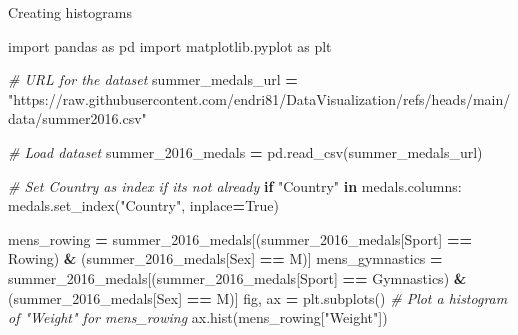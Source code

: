 \documentclass[
  ignorenonframetext,
]{beamer}
\newenvironment{Shaded}{\begin{snugshade}}{\end{snugshade}}
\newcommand{\CommentTok}[1]{\textcolor[rgb]{0.56,0.35,0.01}{\textit{#1}}}
\newcommand{\ControlFlowTok}[1]{\textcolor[rgb]{0.13,0.29,0.53}{\textbf{#1}}}
\newcommand{\ImportTok}[1]{#1}
\newcommand{\KeywordTok}[1]{\textcolor[rgb]{0.13,0.29,0.53}{\textbf{#1}}}
\newcommand{\NormalTok}[1]{#1}
\newcommand{\OperatorTok}[1]{\textcolor[rgb]{0.81,0.36,0.00}{\textbf{#1}}}
\newcommand{\StringTok}[1]{\textcolor[rgb]{0.31,0.60,0.02}{#1}}
\newcommand{\VariableTok}[1]{\textcolor[rgb]{0.00,0.00,0.00}{#1}}
\begin{document}
\begin{frame}[fragile]{Creating histograms}
\label{creating-histograms-2}

\begin{Shaded}
\begin{Highlighting}[]
\ImportTok{import}\NormalTok{ pandas }\ImportTok{as}\NormalTok{ pd}
\ImportTok{import}\NormalTok{ matplotlib.pyplot }\ImportTok{as}\NormalTok{ plt}

\CommentTok{\# URL for the dataset}
\NormalTok{summer\_medals\_url }\OperatorTok{=} \StringTok{"https://raw.githubusercontent.com/endri81/DataVisualization/refs/heads/main/data/summer2016.csv"}

\CommentTok{\# Load dataset}
\NormalTok{summer\_2016\_medals }\OperatorTok{=}\NormalTok{ pd.read\_csv(summer\_medals\_url)}

\CommentTok{\# Set \textquotesingle{}Country\textquotesingle{} as index if it\textquotesingle{}s not already}
\ControlFlowTok{if} \StringTok{"Country"} \KeywordTok{in}\NormalTok{ medals.columns:}
\NormalTok{    medals.set\_index(}\StringTok{"Country"}\NormalTok{, inplace}\OperatorTok{=}\VariableTok{True}\NormalTok{)}
\end{Highlighting}
\end{Shaded}


\begin{Shaded}
\begin{Highlighting}[]
\NormalTok{mens\_rowing }\OperatorTok{=}\NormalTok{ summer\_2016\_medals[(summer\_2016\_medals[}\StringTok{\textquotesingle{}Sport\textquotesingle{}}\NormalTok{] }\OperatorTok{==} \StringTok{\textquotesingle{}Rowing\textquotesingle{}}\NormalTok{) }\OperatorTok{\&}\NormalTok{ (summer\_2016\_medals[}\StringTok{\textquotesingle{}Sex\textquotesingle{}}\NormalTok{] }\OperatorTok{==} \StringTok{\textquotesingle{}M\textquotesingle{}}\NormalTok{)]}
\NormalTok{mens\_gymnastics }\OperatorTok{=}\NormalTok{ summer\_2016\_medals[(summer\_2016\_medals[}\StringTok{\textquotesingle{}Sport\textquotesingle{}}\NormalTok{] }\OperatorTok{==} \StringTok{\textquotesingle{}Gymnastics\textquotesingle{}}\NormalTok{) }\OperatorTok{\&}\NormalTok{ (summer\_2016\_medals[}\StringTok{\textquotesingle{}Sex\textquotesingle{}}\NormalTok{] }\OperatorTok{==} \StringTok{\textquotesingle{}M\textquotesingle{}}\NormalTok{)]}
\NormalTok{fig, ax }\OperatorTok{=}\NormalTok{ plt.subplots()}
\CommentTok{\# Plot a histogram of "Weight" for mens\_rowing}
\NormalTok{ax.hist(mens\_rowing[}\StringTok{"Weight"}\NormalTok{])}
\end{Highlighting}
\end{Shaded}
\end{frame}
\end{document}
